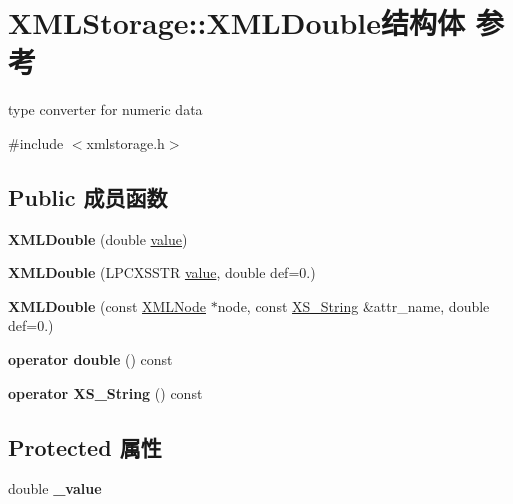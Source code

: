 \hypertarget{struct_x_m_l_storage_1_1_x_m_l_double}{}\section{X\+M\+L\+Storage\+:\+:X\+M\+L\+Double结构体 参考}
\label{struct_x_m_l_storage_1_1_x_m_l_double}


type converter for numeric data  




{\ttfamily \#include $<$xmlstorage.\+h$>$}

\subsection*{Public 成员函数}
\begin{DoxyCompactItemize}
\item 
\mbox{\label{struct_x_m_l_storage_1_1_x_m_l_double_aead19992d904cffd25d4c1b144e7dd36}} 
{\bfseries X\+M\+L\+Double} (double \hyperlink{unionvalue}{value})
\item 
\mbox{\label{struct_x_m_l_storage_1_1_x_m_l_double_a86a12f1ce2f56c82db462069a5c31d31}} 
{\bfseries X\+M\+L\+Double} (L\+P\+C\+X\+S\+S\+TR \hyperlink{unionvalue}{value}, double def=0.)
\item 
\mbox{\label{struct_x_m_l_storage_1_1_x_m_l_double_a4ab95077dc306b8ed460a7b0adebc567}} 
{\bfseries X\+M\+L\+Double} (const \hyperlink{struct_x_m_l_storage_1_1_x_m_l_node}{X\+M\+L\+Node} $\ast$node, const \hyperlink{struct_x_m_l_storage_1_1_x_s___string}{X\+S\+\_\+\+String} \&attr\+\_\+name, double def=0.)
\item 
\mbox{\label{struct_x_m_l_storage_1_1_x_m_l_double_a617a1bce76cf9f0ed020028480309922}} 
{\bfseries operator double} () const
\item 
\mbox{\label{struct_x_m_l_storage_1_1_x_m_l_double_a8919ac879aa3f8a520c4f9de031f23a5}} 
{\bfseries operator X\+S\+\_\+\+String} () const
\end{DoxyCompactItemize}
\subsection*{Protected 属性}
\begin{DoxyCompactItemize}
\item 
\mbox{\label{struct_x_m_l_storage_1_1_x_m_l_double_a51119cd519448eb3d52369936d8c0847}} 
double {\bfseries \+\_\+value}
\end{DoxyCompactItemize}


